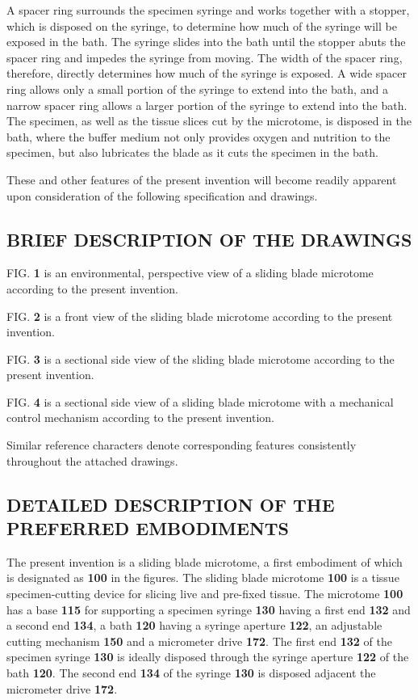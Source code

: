 \documentclass{article}
\begin{document}
A spacer ring surrounds the specimen syringe and works together with a stopper, which is disposed on the syringe, to determine how much of the syringe will be exposed in the bath. The syringe slides into the bath until the stopper abuts the spacer ring and impedes the syringe from moving. The width of the spacer ring, therefore, directly determines how much of the syringe is exposed. A wide spacer ring allows only a small portion of the syringe to extend into the bath, and a narrow spacer ring allows a larger portion of the syringe to extend into the bath. The specimen, as well as the tissue slices cut by the microtome, is disposed in the bath, where the buffer medium not only provides oxygen and nutrition to the specimen, but also lubricates the blade as it cuts the specimen in the bath.

These and other features of the present invention will become readily apparent upon consideration of the following specification and drawings.

\subsection*{BRIEF DESCRIPTION OF THE DRAWINGS}

FIG. \textbf{1} is an environmental, perspective view of a sliding blade microtome according to the present invention.

FIG. \textbf{2} is a front view of the sliding blade microtome according to the present invention.

FIG. \textbf{3} is a sectional side view of the sliding blade microtome according to the present invention.

FIG. \textbf{4} is a sectional side view of a sliding blade microtome with a mechanical control mechanism according to the present invention.

Similar reference characters denote corresponding features consistently throughout the attached drawings.

\subsection*{DETAILED DESCRIPTION OF THE PREFERRED EMBODIMENTS}

The present invention is a sliding blade microtome, a first embodiment of which is designated as \textbf{100} in the figures. The sliding blade microtome \textbf{100} is a tissue specimen-cutting device for slicing live and pre-fixed tissue. The microtome \textbf{100} has a base \textbf{115} for supporting a specimen syringe \textbf{130} having a first end \textbf{132} and a second end \textbf{134}, a bath \textbf{120} having a syringe aperture \textbf{122}, an adjustable cutting mechanism \textbf{150} and a micrometer drive \textbf{172}. The first end \textbf{132} of the specimen syringe \textbf{130} is ideally disposed through the syringe aperture \textbf{122} of the bath \textbf{120}. The second end \textbf{134} of the syringe \textbf{130} is disposed adjacent the micrometer drive \textbf{172}.
\end{document}
